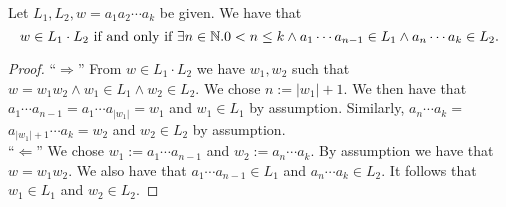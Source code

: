     \begin{lemma}
        \label{concP}
        Let $L_1, L_2, w = a_1 a_2 \cdots a_k$ be given. We have that
        \begin{equation*}
            w \in L_1 \cdot L_2  \\
            \mbox{ if and only if }  \\
            \exists n \in \mathbb{N}. 0 < n \le k \wedge a_1 \cdots a_{n-1} \in L_1 \wedge a_n \cdots a_k \in L_2.
        \end{equation*}
    \end{lemma}
    \begin{proof}
        ``$\Rightarrow$'' 
        From $w \in L_1 \cdot L_2$ we have $w_1, w_2$ such that $w = w_1 w_2 \wedge w_1 \in L_1 \wedge w_2 \in L_2$.
        We chose $n := |w_1|+1$. We then have that $a_1 \cdots a_{n-1} = a_1 \cdots a_{|w_1|} = w_1$ and $w_1 \in L_1$ by assumption.
        Similarly, $a_{n} \cdots a_k = $$ a_{|w_1| + 1} \cdots a_k = w_2$ and $w_2 \in L_2$ by assumption.
        \\
        ``$\Leftarrow$'' 
        We chose $w_1 := a_1 \cdots a_{n-1}$ and $w_2 := a_n \cdots a_k$. By assumption we have that $w = w_1 w_2$.
        We also have that $a_1 \cdots a_{n-1} \in L_1$ and $a_{n} \cdots a_k \in L_2$. 
        It follows that $w_1 \in L_1$ and $w_2 \in L_2$.
    \end{proof}
    


